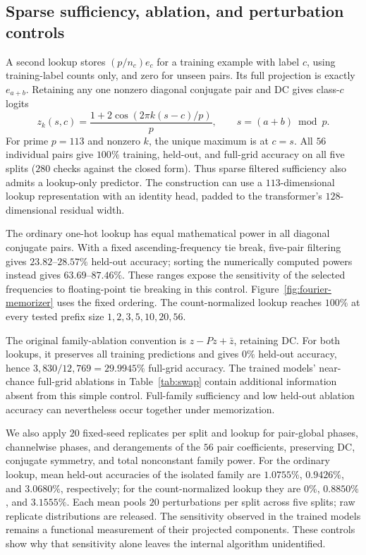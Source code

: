 \subsection{Sparse sufficiency, ablation, and perturbation controls}

A second lookup stores $(p/n_c)e_c$ for a training example with label $c$, using training-label counts only, and zero for unseen pairs. Its full projection is exactly $e_{a+b}$. Retaining any one nonzero diagonal conjugate pair and DC gives class-$c$ logits
\begin{equation}
z_k(s,c)=\frac{1+2\cos(2\pi k(s-c)/p)}{p},\qquad s=(a+b)\bmod p.
\end{equation}
For prime $p=113$ and nonzero $k$, the unique maximum is at $c=s$. All $56$ individual pairs give $100\%$ training, held-out, and full-grid accuracy on all five splits ($280$ checks against the closed form). Thus sparse filtered sufficiency also admits a lookup-only predictor. The construction can use a $113$-dimensional lookup representation with an identity head, padded to the transformer's $128$-dimensional residual width.

The ordinary one-hot lookup has equal mathematical power in all diagonal conjugate pairs. With a fixed ascending-frequency tie break, five-pair filtering gives $23.82$--$28.57\%$ held-out accuracy; sorting the numerically computed powers instead gives $63.69$--$87.46\%$. These ranges expose the sensitivity of the selected frequencies to floating-point tie breaking in this control. Figure~\ref{fig:fourier-memorizer} uses the fixed ordering. The count-normalized lookup reaches $100\%$ at every tested prefix size $1,2,3,5,10,20,56$.

The original family-ablation convention is $z-Pz+\bar z$, retaining DC. For both lookups, it preserves all training predictions and gives $0\%$ held-out accuracy, hence $3{,}830/12{,}769=29.9945\%$ full-grid accuracy. The trained models' near-chance full-grid ablations in Table~\ref{tab:swap} contain additional information absent from this simple control. Full-family sufficiency and low held-out ablation accuracy can nevertheless occur together under memorization.

We also apply $20$ fixed-seed replicates per split and lookup for pair-global phases, channelwise phases, and derangements of the $56$ pair coefficients, preserving DC, conjugate symmetry, and total nonconstant family power. For the ordinary lookup, mean held-out accuracies of the isolated family are $1.0755\%$, $0.9426\%$, and $3.0680\%$, respectively; for the count-normalized lookup they are $0\%$, $0.8850\%$, and $3.1555\%$. Each mean pools $20$ perturbations per split across five splits; raw replicate distributions are released. The sensitivity observed in the trained models remains a functional measurement of their projected components. These controls show why that sensitivity alone leaves the internal algorithm unidentified.

